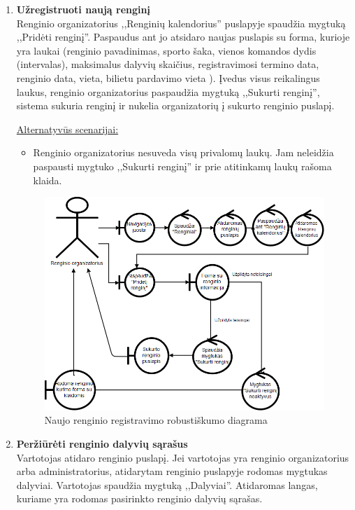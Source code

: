 \documentclass{VUMIFPSkursinis}
\begin{document}
\begin{enumerate} [label = \textbf{U\arabic*.}]
			\item \textbf{Užregistruoti naują renginį}   \\
					Renginio organizatorius ,,Renginių kalendorius'' puslapyje spaudžia mygtuką ,,Pridėti renginį''. Paspaudus ant jo atsidaro naujas puslapis su forma, kurioje yra laukai (renginio pavadinimas, sporto šaka, vienos komandos dydis (intervalas), maksimalus dalyvių skaičius, registravimosi termino data, renginio data, vieta, bilietu pardavimo vieta ). Įvedus visus reikalingus laukus, renginio organizatorius paspaudžia mygtuką ,,Sukurti renginį'', sistema sukuria renginį ir nukelia organizatorių į sukurto renginio puslapį.
						
					\underline{Alternatyvūs scenarijai:}
					\begin{itemize}
						\item Renginio organizatorius nesuveda visų privalomų laukų. Jam neleidžia paspausti mygtuko ,,Sukurti renginį'' ir prie atitinkamų laukų rašoma klaida.
					\end{itemize}

					\begin{figure}[H]
						\centering
						\includegraphics[width=\textwidth]{img/PSI5/u32.png}
						\caption{Naujo renginio registravimo robustiškumo diagrama}
						\label{draw:u32}
					\end{figure}
			
			\item \textbf{Peržiūrėti renginio dalyvių sąrašus}   \\
					Vartotojas atidaro renginio puslapį. Jei vartotojas yra renginio organizatorius arba administratorius, atidarytam renginio puslapyje rodomas mygtukas dalyviai. Vartotojas spaudžia mygtuką ,,Dalyviai''. Atidaromas langas, kuriame yra rodomas pasirinkto renginio dalyvių sąrašas.
					

\end{enumerate}
\end{document}
